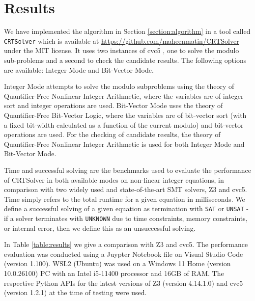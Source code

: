 \section{Results}
\label{section:results}

We have implemented the algorithm in Section \ref{section:algorithm}
in a tool called \texttt{CRTSolver} which is available at
\url{https://github.com/maheenmatin/CRTSolver} under the MIT license.
%
It uses two instances of cvc5 \cite{DBLP:conf/tacas/BarbosaBBKLMMMN22}, one to solve the modulo sub-problems
and a second to check the candidate results.  The following options
are available: Integer Mode and Bit-Vector Mode. 

Integer Mode attempts to
solve the modulo subproblems using the theory of Quantifier-Free Nonlinear
Integer Arithmetic, where the variables are of integer sort and integer
operations are used. 
Bit-Vector Mode uses the theory of Quantifier-Free
Bit-Vector Logic, where the variables are of bit-vector sort (with a fixed
bit-width calculated as a function of the current modulo) and bit-vector
operations are used.
For the checking of candidate results, the theory of Quantifier-Free
Nonlinear Integer Arithmetic is used for both Integer Mode and Bit-Vector
Mode.

Time and successful solving are the benchmarks used to evaluate the performance of CRTSolver 
in both available modes on non-linear integer equations, in comparison with two
widely used and state-of-the-art SMT solvers, Z3 \cite{10.1007/978-3-540-78800-3_24} and cvc5.
Time simply refers to the total runtime for a given equation in milliseconds. 
We define a successful solving of a given
equation as termination with \texttt{SAT} or \texttt{UNSAT} - if a solver terminates
with \texttt{UNKNOWN} due to time constraints, memory constraints, or internal error,
then we define this as an unsuccessful solving.

In Table \ref{table:results} we give a comparison with Z3 and cvc5.
The performance evaluation was conducted using a Juypter Notebook file on Visual Studio Code (version 1.100).
WSL2 (Ubuntu) was used on a Windows 11 Home (version 10.0.26100) PC with an Intel i5-11400 processor and 
16GB of RAM. The respective Python APIs for the latest versions of Z3 (version 4.14.1.0) and cvc5 
(version 1.2.1) at the time of testing were used.

